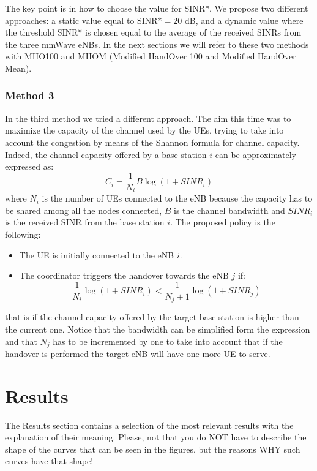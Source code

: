 \documentclass[conference,10pt]{IEEEtran}
\begin{document}
The key point is in how to choose the value for SINR*. We propose two different approaches: a static value equal to SINR*$=20$ dB, and a dynamic value where the threshold SINR* is chosen equal to the average of the received SINRs from the three mmWave eNBs. In the next sections we will refer to these two methods with MHO100 and MHOM (Modified HandOver 100 and Modified HandOver Mean).

\subsubsection{Method 3}
 In the third method we tried a different approach. The aim this time was to maximize the capacity of the channel used by the UEs, trying to take into account the congestion by means of the Shannon formula for channel capacity. Indeed, the channel capacity offered by a base station $i$ can be approximately expressed as:
 $$
 C_i=\frac{1}{N_i} B \log(1+SINR_i)
 $$
\noindent where $N_i$ is the number of UEs connected to the eNB because the capacity has to be shared among all the nodes connected, $B$ is the channel bandwidth and $SINR_i$ is the received SINR from the base station $i$. 
The proposed policy is the following:

\begin{itemize}
	\item The UE is initially connected to the eNB $i$.
	\item The coordinator triggers the handover towards the eNB $j$ if:
	$$
	\frac{1}{N_i} \log(1+SINR_i) < \frac{1}{N_j+1} \log(1+SINR_j)
	$$ 
\end{itemize}
\noindent that is if the channel capacity offered by the target base station is higher than the current one. Notice that the bandwidth can be simplified form the expression and that $N_j$ has to be incremented by one to take into account that if the handover is performed the target eNB will have one more UE to serve.

\section{Results}\label{sec:res}
The Results section contains a selection of the most relevant results with the explanation of their meaning. Please, not that you do NOT have to describe the shape of the curves that can be seen in the figures, but the reasons WHY such curves have that shape!
\end{document}
